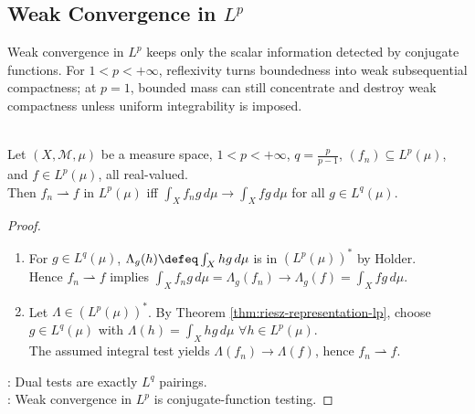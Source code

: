 \subsection{Weak Convergence in \texorpdfstring{$L^p$}{Lp}}

Weak convergence in $L^p$ keeps only the scalar information detected by conjugate functions. For $1<p<+\infty$, reflexivity turns boundedness into weak subsequential compactness; at $p=1$, bounded mass can still concentrate and destroy weak compactness unless uniform integrability is imposed.

\begin{theorem} \label{thm:lp-weak-convergence-dual-tests} \\
Let $(X,\mathcal M,\mu)$ be a measure space, $1<p<+\infty$, $q=\frac{p}{p-1}$, $(f_n)\subseteq L^p(\mu)$, and $f\in L^p(\mu)$, all real-valued.\\
Then $f_n\rightharpoonup f$ in $L^p(\mu)$ iff $\int_X f_ng\,d\mu\to\int_X fg\,d\mu$ for all $g\in L^q(\mu)$.
\begin{proof}
\begin{enumerate}[label=\roman*.]
\setlength{\itemsep}{0pt}
\item[$(\Rightarrow)$] For $g\in L^q(\mu)$, $\Lambda_g(h)\defeq\int_Xhg\,d\mu$ is in $(L^p(\mu))^*$ by Holder.\\
Hence $f_n\rightharpoonup f$ implies $\int_Xf_ng\,d\mu=\Lambda_g(f_n)\to\Lambda_g(f)=\int_Xfg\,d\mu$.
\item[$(\Leftarrow)$] Let $\Lambda\in(L^p(\mu))^*$. By Theorem \ref{thm:riesz-representation-lp}, choose $g\in L^q(\mu)$ with $\Lambda(h)=\int_Xhg\,d\mu$ $\forall h\in L^p(\mu)$.\\
The assumed integral test yields $\Lambda(f_n)\to\Lambda(f)$, hence $f_n\rightharpoonup f$.
\end{enumerate}
: Dual tests are exactly $L^q$ pairings.\\
: Weak convergence in $L^p$ is conjugate-function testing.
\end{proof}
\end{theorem}

